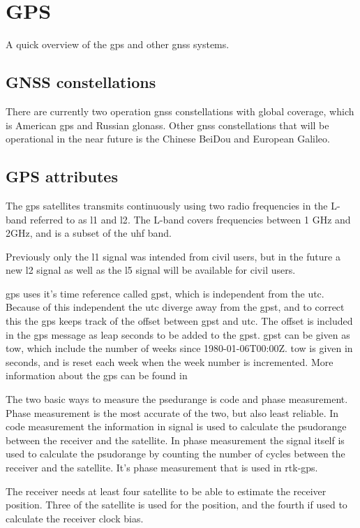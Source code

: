 \section{GPS}
A quick overview of the gps and other gnss systems.
\subsection{GNSS constellations}
There are currently two operation \gls{gnss} constellations with global coverage, which is American \gls{gps} and Russian \gls{glonass}. Other \gls{gnss} constellations that will be operational in the near future is the Chinese BeiDou and European Galileo.
\subsection{GPS attributes}
The \gls{gps} satellites transmits continuously using two radio frequencies in the L-band referred to as \gls{l1} and {l2}. The L-band covers frequencies between 1 GHz and 2GHz, and is a subset of the \gls{uhf} band.

Previously only the \gls{l1} signal was intended from civil users, but in the future a new {l2} signal as well as the \gls{l5} signal will be available for civil users. 

\gls{gps} uses it's time reference called \gls{gpst}, which is independent from the \gls{utc}. Because of this independent the \gls{utc} diverge away from the \gls{gpst}, and to correct this the \gls{gps} keeps track of the offset between \gls{gpst} and \gls{utc}. The offset is included in the \gls{gps} message as leap seconds to be added to the \gls{gpst}. \gls{gpst} can be given as \gls{tow}, which include the number of weeks since 1980-01-06T00:00Z. \gls{tow} is given in seconds, and is reset each week when the week number is incremented. More information about the \gls{gps} can be found in \citep{GPSBOOK,vik2014integrated} 

The two basic ways to measure the psedurange is code and phase measurement. Phase measurement is the most accurate of the two, but also least reliable.
In code measurement the information in signal is used to calculate the psudorange between the receiver and the satellite. In phase measurement the signal itself is used to calculate the psudorange by counting the number of cycles between the receiver and the satellite. It's phase measurement that is used in \gls{rtk-gps}.

The receiver needs at least four satellite to be able to estimate the receiver position. Three of the satellite is used for the position, and the fourth if used to calculate the receiver clock bias. 
 
